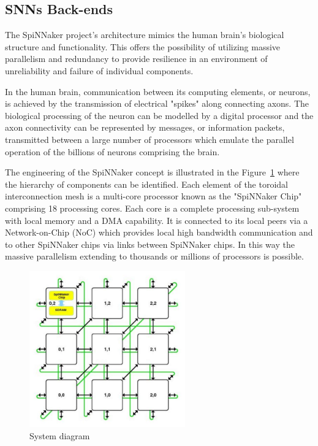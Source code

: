 \subsection{SNNs Back-ends}
The SpiNNaker project's architecture mimics the human brain's biological structure and functionality. 
This offers the possibility of utilizing massive parallelism and redundancy to provide resilience in an environment of unreliability and failure of individual components.

In the human brain, communication between its computing elements, or neurons, is achieved by the transmission of electrical "spikes" along connecting axons. 
The biological processing of the neuron can be modelled by a digital processor and the axon connectivity can be represented by messages, or information packets, transmitted between a large number of processors which emulate the parallel operation of the billions of neurons comprising the brain.

The engineering of the SpiNNaker concept is illustrated in the Figure~\ref{fig:sysdia} where the hierarchy of components can be identified. 
Each element of the toroidal interconnection mesh is a multi-core processor known as the "SpiNNaker Chip" comprising 18 processing cores. 
Each core is a complete processing sub-system with local memory and a DMA capability. 
It is connected to its local peers via a Network-on-Chip (NoC) which provides local high bandwidth communication and to other SpiNNaker chips via links between SpiNNaker chips. 
In this way the massive parallelism extending to thousands or millions of processors is possible.

\begin{figure}
\centering
	\includegraphics[width=0.6\textwidth]{pics/mesh_ctiff.jpg}
	\caption{System diagram}
	\label{fig:sysdia}
\end{figure}

